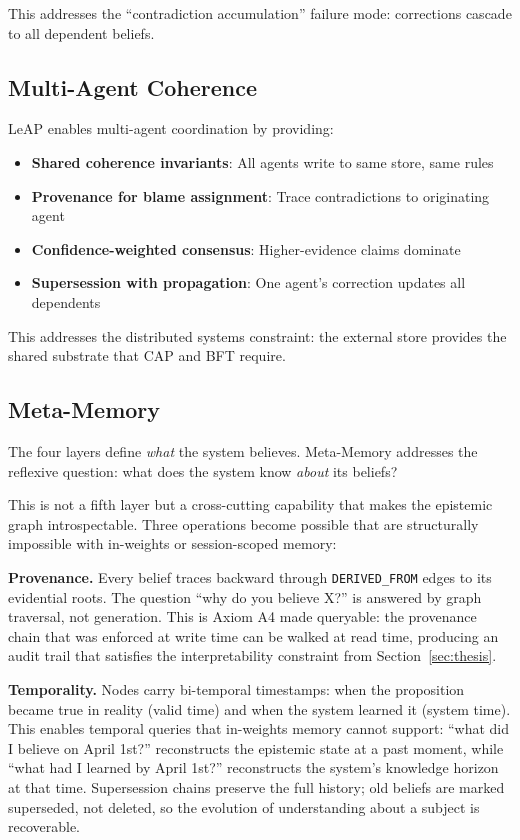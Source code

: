 \documentclass[11pt,letterpaper]{article}
\begin{document}
This addresses the ``contradiction accumulation'' failure mode: corrections cascade to all dependent beliefs.

\subsection{Multi-Agent Coherence}

LeAP enables multi-agent coordination by providing:

\begin{itemize}[noitemsep]
    \item \textbf{Shared coherence invariants}: All agents write to same store, same rules
    \item \textbf{Provenance for blame assignment}: Trace contradictions to originating agent
    \item \textbf{Confidence-weighted consensus}: Higher-evidence claims dominate
    \item \textbf{Supersession with propagation}: One agent's correction updates all dependents
\end{itemize}

This addresses the distributed systems constraint: the external store provides the shared substrate that CAP and BFT require.

\subsection{Meta-Memory}

The four layers define \textit{what} the system believes. Meta-Memory addresses the reflexive question: what does the system know \textit{about} its beliefs?

This is not a fifth layer but a cross-cutting capability that makes the epistemic graph introspectable. Three operations become possible that are structurally impossible with in-weights or session-scoped memory:

\textbf{Provenance.} Every belief traces backward through \texttt{DERIVED\_FROM} edges to its evidential roots. The question ``why do you believe X?'' is answered by graph traversal, not generation. This is Axiom A4 made queryable: the provenance chain that was enforced at write time can be walked at read time, producing an audit trail that satisfies the interpretability constraint from Section~\ref{sec:thesis}.

\textbf{Temporality.} Nodes carry bi-temporal timestamps: when the proposition became true in reality (valid time) and when the system learned it (system time). This enables temporal queries that in-weights memory cannot support: ``what did I believe on April 1st?'' reconstructs the epistemic state at a past moment, while ``what had I learned by April 1st?'' reconstructs the system's knowledge horizon at that time. Supersession chains preserve the full history; old beliefs are marked superseded, not deleted, so the evolution of understanding about a subject is recoverable.
\end{document}
